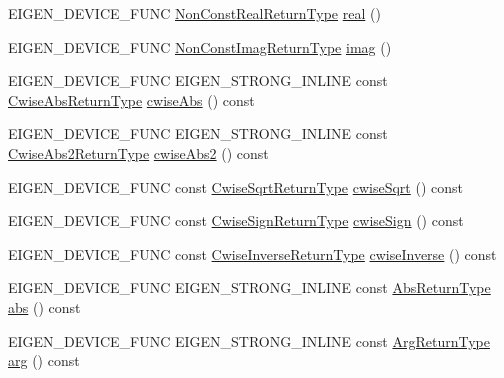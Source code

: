 \begin{DoxyCompactItemize}
\item 
E\+I\+G\+E\+N\+\_\+\+D\+E\+V\+I\+C\+E\+\_\+\+F\+U\+NC \mbox{\hyperlink{struct_eigen_1_1internal_1_1true__type}{Non\+Const\+Real\+Return\+Type}} \mbox{\hyperlink{class_eigen_1_1_array_base_ab520a5e364380a10d471534c1e3d2253}{real}} ()
\item 
E\+I\+G\+E\+N\+\_\+\+D\+E\+V\+I\+C\+E\+\_\+\+F\+U\+NC \mbox{\hyperlink{class_eigen_1_1_cwise_unary_view}{Non\+Const\+Imag\+Return\+Type}} \mbox{\hyperlink{class_eigen_1_1_array_base_a09aadb6a71f9293d19c638598a418c92}{imag}} ()
\item 
E\+I\+G\+E\+N\+\_\+\+D\+E\+V\+I\+C\+E\+\_\+\+F\+U\+NC E\+I\+G\+E\+N\+\_\+\+S\+T\+R\+O\+N\+G\+\_\+\+I\+N\+L\+I\+NE const \mbox{\hyperlink{class_eigen_1_1_cwise_unary_op}{Cwise\+Abs\+Return\+Type}} \mbox{\hyperlink{class_eigen_1_1_array_base_a43bf848499e8562675e8c5881ac1ee97}{cwise\+Abs}} () const
\item 
E\+I\+G\+E\+N\+\_\+\+D\+E\+V\+I\+C\+E\+\_\+\+F\+U\+NC E\+I\+G\+E\+N\+\_\+\+S\+T\+R\+O\+N\+G\+\_\+\+I\+N\+L\+I\+NE const \mbox{\hyperlink{class_eigen_1_1_cwise_unary_op}{Cwise\+Abs2\+Return\+Type}} \mbox{\hyperlink{class_eigen_1_1_array_base_aab34a23028035fd99c8b1a3ef54443f7}{cwise\+Abs2}} () const
\item 
E\+I\+G\+E\+N\+\_\+\+D\+E\+V\+I\+C\+E\+\_\+\+F\+U\+NC const \mbox{\hyperlink{class_eigen_1_1_cwise_unary_op}{Cwise\+Sqrt\+Return\+Type}} \mbox{\hyperlink{class_eigen_1_1_array_base_adc3329bedde0fbe79a4dc2389b2cffd9}{cwise\+Sqrt}} () const
\item 
E\+I\+G\+E\+N\+\_\+\+D\+E\+V\+I\+C\+E\+\_\+\+F\+U\+NC const \mbox{\hyperlink{class_eigen_1_1_cwise_unary_op}{Cwise\+Sign\+Return\+Type}} \mbox{\hyperlink{class_eigen_1_1_array_base_a100fa382843831044abbf77ca9280eaa}{cwise\+Sign}} () const
\item 
E\+I\+G\+E\+N\+\_\+\+D\+E\+V\+I\+C\+E\+\_\+\+F\+U\+NC const \mbox{\hyperlink{class_eigen_1_1_cwise_unary_op}{Cwise\+Inverse\+Return\+Type}} \mbox{\hyperlink{class_eigen_1_1_array_base_a37217e1af9759d31758b61cb9d9a2eb0}{cwise\+Inverse}} () const
\item 
E\+I\+G\+E\+N\+\_\+\+D\+E\+V\+I\+C\+E\+\_\+\+F\+U\+NC E\+I\+G\+E\+N\+\_\+\+S\+T\+R\+O\+N\+G\+\_\+\+I\+N\+L\+I\+NE const \mbox{\hyperlink{class_eigen_1_1_cwise_unary_op}{Abs\+Return\+Type}} \mbox{\hyperlink{class_eigen_1_1_array_base_a5efe92eb15ea504206269a2a19b9878c}{abs}} () const
\item 
E\+I\+G\+E\+N\+\_\+\+D\+E\+V\+I\+C\+E\+\_\+\+F\+U\+NC E\+I\+G\+E\+N\+\_\+\+S\+T\+R\+O\+N\+G\+\_\+\+I\+N\+L\+I\+NE const \mbox{\hyperlink{class_eigen_1_1_cwise_unary_op}{Arg\+Return\+Type}} \mbox{\hyperlink{class_eigen_1_1_array_base_a38ad76c91fa4dcb1daae506098b30ae5}{arg}} () const

\end{DoxyCompactItemize}
